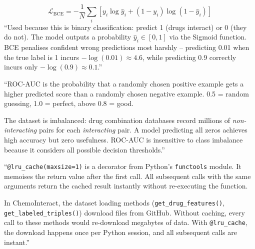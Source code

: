 \documentclass[12pt,a4paper,oneside]{book}
\begin{document}
\begin{tcolorbox}[questionbox,title={Q5: What is Binary Cross-Entropy Loss and why use it?}]
\end{tcolorbox}
\begin{tcolorbox}[answerbox]
\[\mathcal{L}_{\mathrm{BCE}} = -\frac{1}{N}\sum_i\left[y_i\log\hat{y}_i + (1-y_i)\log(1-\hat{y}_i)\right]\]
``Used because this is binary classification: predict 1 (drugs interact) or 0 (they do not). The model outputs a probability $\hat{y}_i \in [0,1]$ via the Sigmoid function. BCE penalises confident wrong predictions most harshly -- predicting 0.01 when the true label is 1 incurs $-\log(0.01) \approx 4.6$, while predicting 0.9 correctly incurs only $-\log(0.9) \approx 0.1$.''
\end{tcolorbox}

\begin{tcolorbox}[questionbox,title={Q6: Why ROC-AUC instead of accuracy?}]
\end{tcolorbox}
\begin{tcolorbox}[answerbox]
``ROC-AUC is the probability that a randomly chosen positive example gets a higher predicted score than a randomly chosen negative example. 0.5 = random guessing, 1.0 = perfect, above 0.8 = good.

The dataset is imbalanced: drug combination databases record millions of \textit{non-interacting} pairs for each \textit{interacting} pair. A model predicting all zeros achieves high accuracy but zero usefulness. ROC-AUC is insensitive to class imbalance because it considers all possible decision thresholds.''
\end{tcolorbox}

\begin{tcolorbox}[questionbox,title={Q7: Explain \texttt{@lru\_cache} and why you used it.}]
\end{tcolorbox}
\begin{tcolorbox}[answerbox]
``\texttt{@lru\_cache(maxsize=1)} is a decorator from Python's \texttt{functools} module. It memoises the return value after the first call. All subsequent calls with the same arguments return the cached result instantly without re-executing the function.

In ChemoInteract, the dataset loading methods (\texttt{get\_drug\_features()}, \texttt{get\_labeled\_triples()}) download files from GitHub. Without caching, every call to these methods would re-download megabytes of data. With \texttt{@lru\_cache}, the download happens once per Python session, and all subsequent calls are instant.''
\end{tcolorbox}
\end{document}
